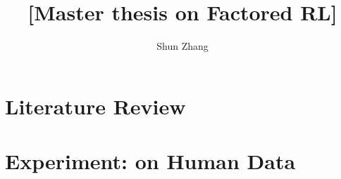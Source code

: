 \documentclass[10pt]{book}
\title{[Master thesis on Factored RL]}
\author{Shun Zhang}
\date{}
\begin{document}
\maketitle

\chapter{Literature Review}



\chapter{Experiment: on Human Data}





\end{document}
